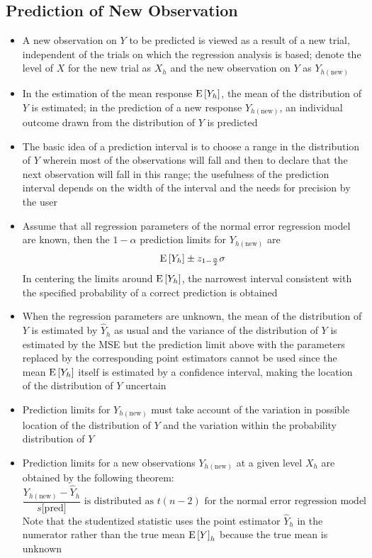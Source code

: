 \subsection{Prediction of New Observation}
\begin{itemize}
\item A new observation on $Y$ to be predicted is viewed as a result of a new trial, independent of the trials on which the regression analysis is based; denote the level of $X$ for the new trial as $X_h$ and the new observation on $Y$ as $Y_{h(\text{new})}$
\item In the estimation of the mean response $\mathrm{E}\left[ Y_h \right]$, the mean of the distribution of $Y$ is estimated; in the prediction of a new response $Y_{h(\text{new})}$, an individual outcome drawn from the distribution of $Y$ is predicted 
\item The basic idea of a prediction interval is to choose a range in the distribution of $Y$ wherein most of the observations will fall and then to declare that the next observation will fall in this range; the usefulness of the prediction interval depends on the width of the interval and the needs for precision by the user
\item Assume that all regression parameters of the normal error regression model are known, then the $1-\alpha$ prediction limits for $Y_{h(\text{new})}$ are $$ \mathrm{E}\left[ Y_h \right] \pm z_{1-\frac{\alpha}{2}} \sigma $$ In centering the limits around $\mathrm{E}\left[ Y_h \right]$, the narrowest interval consistent with the specified probability of a correct prediction is obtained 
\item When the regression parameters are unknown, the mean of the distribution of $Y$ is estimated by $\hat{Y}_h$ as usual and the variance of the distribution of $Y$ is estimated by the MSE but the prediction limit above with the parameters replaced by the corresponding point estimators cannot be used since the mean $\mathrm{E}\left[ Y_h \right]$ itself is estimated by a confidence interval, making the location of the distribution of $Y$ uncertain
\item Prediction limits for $Y_{h(\text{new})}$ must take account of the variation in possible location of the distribution of $Y$ and the variation within the probability distribution of $Y$
\item Prediction limits for a new observations $Y_{h(\text{new})}$ at a given level $X_h$ are obtained by the following theorem: $$ \frac{Y_{h(\text{new})} - \hat{Y}_h}{s[\text{pred]}} \text{ is distributed as } t(n-2) \text{ for the normal error regression model} $$ Note that the studentized statistic uses the point estimator $\hat{Y}_h$ in the numerator rather than the true mean $\mathrm{E}\left[ Y \right]_h$ because the true mean is unknown

\end{itemize}
